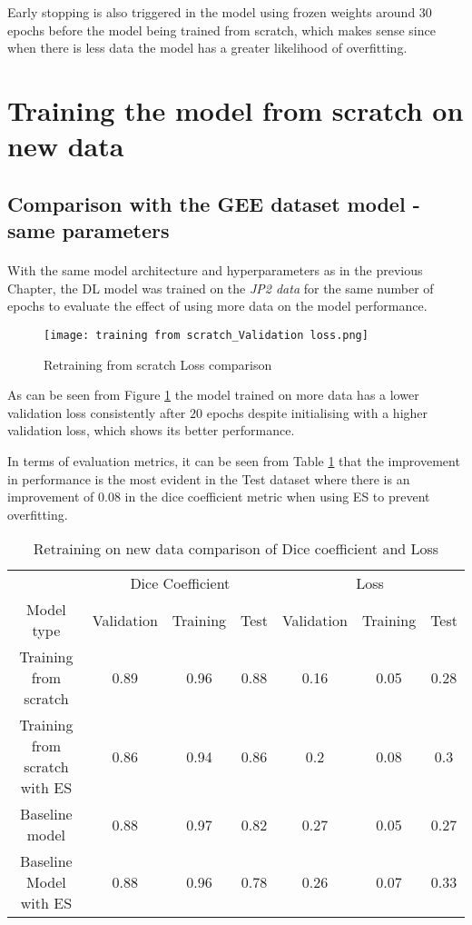 Early stopping is also triggered in the model using frozen weights around $30$ epochs before the model being trained from scratch, which makes sense since when there is less data the model has a greater likelihood of overfitting.

\section{Training the model from scratch on new data} \label{new_data_fs}
\subsection{Comparison with the \gls{GEE} dataset model - same parameters}
\paragraph{}
With the same model architecture and hyperparameters as in the previous Chapter, the \gls{DL} model was trained on the \textit{JP2 data} for the same number of epochs to evaluate the effect of using more data on the model performance.

\begin{figure}[hbt!]
    \centering
    \texttt{[image: training from scratch\_Validation loss.png]}
    \caption{Retraining from scratch Loss comparison}
    \label{fs_loss}
\end{figure}
As can be seen from Figure \ref{fs_loss} the model trained on more data has a lower validation loss consistently after $20$ epochs despite initialising with a higher validation loss, which shows its better performance. 

In terms of evaluation metrics, it can be seen from Table \ref{tab_fs} that the improvement in performance is the most evident in the Test dataset where there is an improvement of $0.08$ in the dice coefficient metric when using \gls{ES} to prevent overfitting.

\begin{table}[ht] 
    \begin{center}
    \begin{tabular}{ccccccc} 
    \toprule
       & \multicolumn{3}{c}{Dice Coefficient}     & \multicolumn{3}{c}{Loss} \\
    Model type & Validation & Training & Test & Validation & Training & Test \\ \midrule
    \rowcolor{lightgray}
    Training from scratch & 0.89 & 0.96 & 0.88 & 0.16 & 0.05 & 0.28  \\ Training from scratch with ES & 0.86 & 0.94 & 0.86 & 0.2 & 0.08 & 0.3  \\ Baseline model & 0.88 & 0.97 & 0.82 & 0.27 & 0.05 & 0.27  \\ Baseline Model with ES & 0.88 & 0.96 & 0.78 & 0.26 & 0.07 & 0.33  \\
    \bottomrule
    \end{tabular}
  \end{center} 
  \caption{Retraining on new data comparison of Dice coefficient and Loss}\label{tab_fs}
\end{table}

